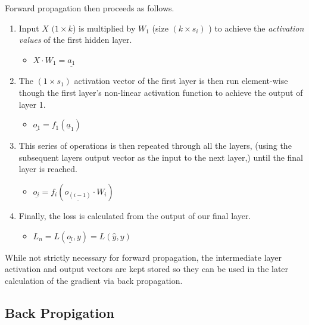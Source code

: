 \documentclass[]{book}
\providecommand{\tightlist}{%
  \setlength{\itemsep}{0pt}\setlength{\parskip}{0pt}}
\theoremstyle{definition}
\theoremstyle{definition}
\theoremstyle{definition}
\theoremstyle{remark}
\begin{document}
Forward propagation then proceeds as follows.

\begin{enumerate}
\def\labelenumi{\arabic{enumi}.}
\tightlist
\item
  Input \(X\) \((1 \times k\)) is multiplied by \(W_1\) (size
  \((k\times s_i)\) ) to achieve the \emph{activation values} of the
  first hidden layer.

  \begin{itemize}
  \tightlist
  \item
    \(X \cdot W_1 = \underline{a_1}\)
  \end{itemize}
\item
  The \((1 \times s_1)\) activation vector of the first layer is then
  run element-wise though the first layer's non-linear activation
  function to achieve the output of layer 1.

  \begin{itemize}
  \tightlist
  \item
    \(\underline{o_1} = f_1(\underline{a}_1)\)
  \end{itemize}
\item
  This series of operations is then repeated through all the layers,
  (using the subsequent layers output vector as the input to the next
  layer,) until the final layer is reached.

  \begin{itemize}
  \tightlist
  \item
    \(\underline{o_i} = f_i(\underline{o_{(i - 1)}} \cdot W_i)\)
  \end{itemize}
\item
  Finally, the loss is calculated from the output of our final layer.

  \begin{itemize}
  \tightlist
  \item
    \(L_n = L(\underline{o_l}, y) = L(\hat{y}, y)\)
  \end{itemize}
\end{enumerate}

While not strictly necessary for forward propagation, the intermediate
layer activation and output vectors are kept stored so they can be used
in the later calculation of the gradient via back propagation.

\subsection{Back Propigation}\label{back-propigation}
\end{document}
